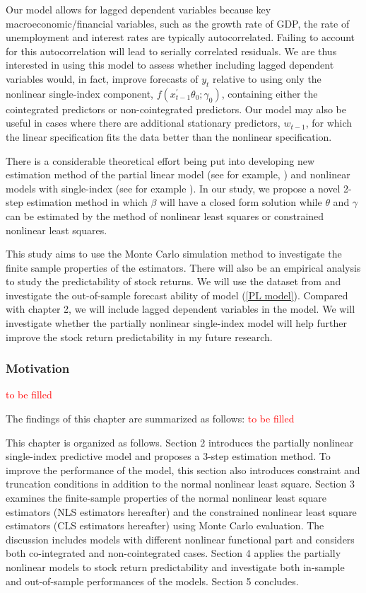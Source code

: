 \documentclass[a4paper,12pt,times,numbered,print,index]{report}
\numberwithin{equation}{section}
\begin{document}
Our model allows for lagged dependent variables because key macroeconomic/financial variables, such as the growth rate of GDP, the rate of unemployment and interest rates are typically autocorrelated. Failing to account for this autocorrelation will lead to serially correlated residuals. We are thus interested in using this model to assess whether including lagged dependent variables would, in fact, improve forecasts of $y_{t}$ relative to using only the nonlinear single-index component, $f\left( x_{t-1}^{\prime }\theta_0; \gamma_0\right)$, containing either the cointegrated predictors or non-cointegrated predictors. Our model may also be useful in cases where there are additional stationary predictors, $w_{t-1}$, for which the linear specification fits the data better than the nonlinear specification.

There is a considerable theoretical effort being put into developing new estimation method of the partial linear model (see for example, \cite{dong2016estimation}) and nonlinear models with single-index (see for example \cite{chang2003index}). In our study, we propose a novel 2-step estimation method in which $\beta$ will have a closed form solution while $\theta$ and $\gamma$ can be estimated by the method of nonlinear least squares or constrained nonlinear least squares.

This study aims to use the Monte Carlo simulation method to investigate the finite sample properties of the estimators. There will also be an empirical analysis to study the predictability of stock returns. We will use the dataset from \cite{welch2008comprehensive} and investigate the out-of-sample forecast ability of model (\ref{PL model}). Compared with chapter 2, we will include lagged dependent variables in the model. We will investigate whether the partially nonlinear single-index model will help further improve the stock return predictability in my future research.  

\subsubsection{Motivation}

\textcolor{red}{to be filled}

The findings of this chapter are summarized as follows:
\textcolor{red}{to be filled}

This chapter is organized as follows. Section 2 introduces the partially nonlinear single-index predictive model and proposes a 3-step estimation method. To improve the performance of the model, this section also introduces constraint and truncation conditions in addition to the normal nonlinear least square. Section 3 examines the finite-sample properties of the normal nonlinear least square estimators (NLS estimators hereafter) and the constrained nonlinear least square estimators (CLS estimators hereafter) using Monte Carlo evaluation. The discussion includes models with different nonlinear functional part and considers both co-integrated and non-cointegrated cases. Section 4 applies the partially nonlinear models to stock return predictability and investigate both in-sample and out-of-sample performances of the models. Section 5 concludes. 
\end{document}
